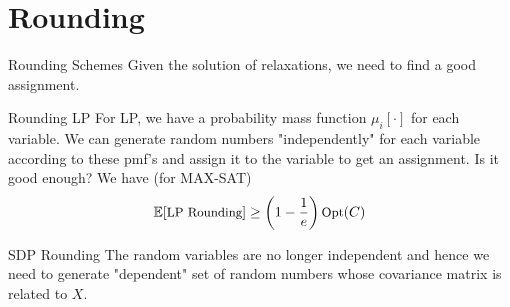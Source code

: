 \documentclass[10pt,t,compress]{beamer}
\begin{document}
\section{Rounding}
\begin{frame}{Rounding Schemes}
Given the solution of relaxations, we need to find a good assignment.
\begin{block}{Rounding LP}
For LP, we have a probability mass function $\mu_i[\cdot]$ for each variable. We can generate random numbers "independently" for each variable according to these pmf's and assign it to the variable to get an assignment. Is it good enough? We have (for MAX-SAT)
\[\small \mathbb{E}[\mbox{LP Rounding}] \geq \left(1-\frac{1}{e} \right) \mbox{Opt}(C) \]
\end{block}

\begin{block}{SDP Rounding}
The random variables are no longer independent and hence we need to generate "dependent" set of random numbers whose covariance matrix is related to $X$.
\end{block}
\end{frame}
\end{document}
